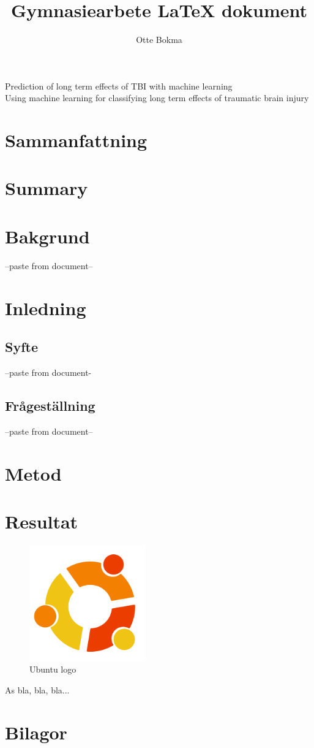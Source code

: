 \documentclass[11pt]{article}
\title{Gymnasiearbete {\LaTeX} dokument}
\author{Otte Bokma}
\begin{document}
\begin{titlepage}

  \begin{center}
    \huge{Prediction of long term effects of TBI with machine learning}
    \\[1cm]
    \large{Using machine learning for classifying long term effects of traumatic brain injury}
  \end{center}
\end{titlepage}

\section*{Sammanfattning}

\section*{Summary}

\tableofcontents

\section{Bakgrund}
--paste from document--

\section{Inledning}

\subsection{Syfte}
--paste from document-

\subsection{Frågeställning}
--paste from document--

\section{Metod}

\section{Resultat}

\begin{figure}[h]
  \centering
  \includegraphics[width=5cm]{graphics/ubuntu.png}
  \caption{Ubuntu logo}
\end{figure}

As \cite{FeatureSelection2020} bla, bla, bla...\\

\section{Bilagor}

\printbibliography
\end{document}
